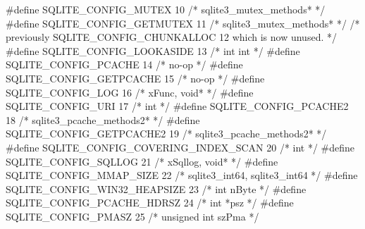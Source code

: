 \begin{Codex}[label=sqlite3.h,numbers=left]
{#define SQLITE_CONFIG_MUTEX        10  /* sqlite3_mutex_methods* */
#define SQLITE_CONFIG_GETMUTEX     11  /* sqlite3_mutex_methods* */
/* previously SQLITE_CONFIG_CHUNKALLOC 12 which is now unused. */ 
#define SQLITE_CONFIG_LOOKASIDE    13  /* int int */
#define SQLITE_CONFIG_PCACHE       14  /* no-op */
#define SQLITE_CONFIG_GETPCACHE    15  /* no-op */
#define SQLITE_CONFIG_LOG          16  /* xFunc, void* */
#define SQLITE_CONFIG_URI          17  /* int */
#define SQLITE_CONFIG_PCACHE2      18  /* sqlite3_pcache_methods2* */
#define SQLITE_CONFIG_GETPCACHE2   19  /* sqlite3_pcache_methods2* */
#define SQLITE_CONFIG_COVERING_INDEX_SCAN 20  /* int */
#define SQLITE_CONFIG_SQLLOG       21  /* xSqllog, void* */
#define SQLITE_CONFIG_MMAP_SIZE    22  /* sqlite3_int64, sqlite3_int64 */
#define SQLITE_CONFIG_WIN32_HEAPSIZE      23  /* int nByte */
#define SQLITE_CONFIG_PCACHE_HDRSZ        24  /* int *psz */
#define SQLITE_CONFIG_PMASZ               25  /* unsigned int szPma */

}
\end{Codex}
